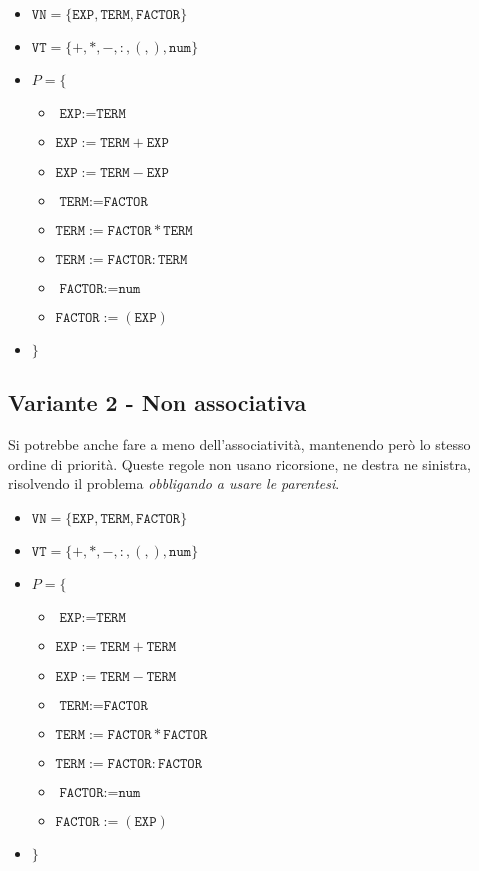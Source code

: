 \begin{itemize}[label={}]
    \item $\texttt{VN} = \{ \texttt{EXP}, \texttt{TERM}, \texttt{FACTOR}\}$
    \item $\texttt{VT} = \{+, *, -, :, (, ), \texttt{num}\}$
    \item $P = \{$
    \begin{itemize}[label={}]
        \item $\texttt{EXP} := \texttt{TERM}$
        \item $\texttt{EXP} := \texttt{TERM} + \texttt{EXP}$
        \item $\texttt{EXP} := \texttt{TERM} - \texttt{EXP}$
        \item $\texttt{TERM} := \texttt{FACTOR}$
        \item $\texttt{TERM} := \texttt{FACTOR} * \texttt{TERM}$
        \item $\texttt{TERM} := \texttt{FACTOR} : \texttt{TERM}$
        \item $\texttt{FACTOR} := \texttt{num}$
        \item $\texttt{FACTOR} := ( \texttt{EXP})$
    \end{itemize}
    \item $\}$
\end{itemize}
\setlist{}


\subsection{Variante 2 - Non associativa}
Si potrebbe anche fare a meno dell'associatività, mantenendo però lo stesso ordine di priorità. Queste regole non usano ricorsione, ne destra ne sinistra, risolvendo il problema \textit{obbligando a usare le parentesi}.

\begin{itemize}[label={}]
    \item $\texttt{VN} = \{ \texttt{EXP}, \texttt{TERM}, \texttt{FACTOR}\}$
    \item $\texttt{VT} = \{+, *, -, :, (, ), \texttt{num}\}$
    \item $P = \{$
    \begin{itemize}[label={}]
        \item $\texttt{EXP} := \texttt{TERM}$
        \item $\texttt{EXP} := \texttt{TERM} + \texttt{TERM}$
        \item $\texttt{EXP} := \texttt{TERM} - \texttt{TERM}$
        \item $\texttt{TERM} := \texttt{FACTOR}$
        \item $\texttt{TERM} := \texttt{FACTOR} * \texttt{FACTOR}$
        \item $\texttt{TERM} := \texttt{FACTOR} : \texttt{FACTOR}$
        \item $\texttt{FACTOR} := \texttt{num}$
        \item $\texttt{FACTOR} := ( \texttt{EXP})$
    \end{itemize}
    \item $\}$
\end{itemize}
\setlist{}

